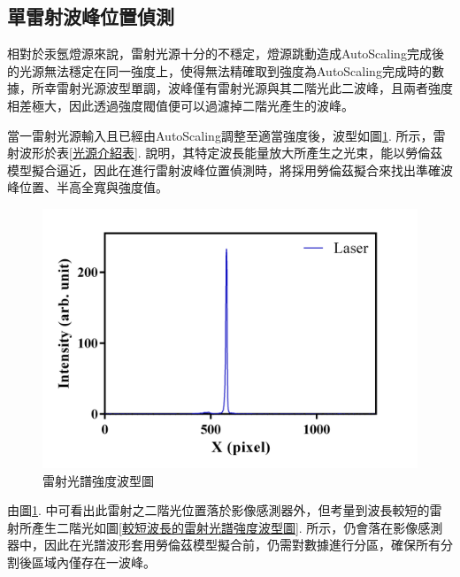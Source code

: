 \subsection{單雷射波峰位置偵測}
相對於汞氬燈源來說，雷射光源十分的不穩定，燈源跳動造成AutoScaling完成後的光源無法穩定在同一強度上，使得無法精確取到強度為AutoScaling完成時的數據，所幸雷射光源波型單調，波峰僅有雷射光源與其二階光\cite{diffraction-2nd-Light}此二波峰，且兩者強度相差極大，因此透過強度閥值便可以過濾掉二階光產生的波峰。\par
當一雷射光源輸入且已經由AutoScaling調整至適當強度後，波型如圖\ref{雷射光譜強度波型圖}. 所示，雷射波形於表\ref{光源介紹表}. 說明，其特定波長能量放大所產生之光束，能以勞倫茲模型擬合逼近，因此在進行雷射波峰位置偵測時，將採用勞倫茲擬合來找出準確波峰位置、半高全寬與強度值。
\begin{figure}[H] %
	\centering %
	\vspace{0.8cm}
	\setlength{\abovecaptionskip}{0.cm}
	\includegraphics[width=\textwidth]{figures/Laser_raw.png} %
	\caption{雷射光譜強度波型圖} %
	\label{雷射光譜強度波型圖} %
\end{figure}
由圖\ref{雷射光譜強度波型圖}. 中可看出此雷射之二階光位置落於影像感測器外，但考量到波長較短的雷射所產生二階光如圖\ref{較短波長的雷射光譜強度波型圖}. 所示，仍會落在影像感測器中，因此在光譜波形套用勞倫茲模型擬合前，仍需對數據進行分區，確保所有分割後區域內僅存在一波峰。
